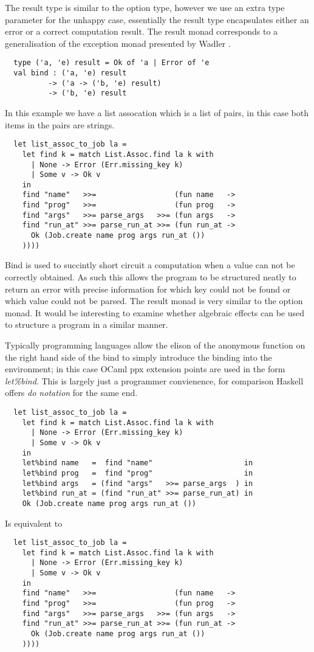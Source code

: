 The result type is similar to the option type, however we use an extra type
parameter for the unhappy case, essentially the result type encapsulates 
either an error or a correct computation result. The result monad
corresponds to a generalisation of the exception monad presented by Wadler \cite{wadler1995monads}.

\begin{verbatim}
  type ('a, 'e) result = Ok of 'a | Error of 'e
  val bind : ('a, 'e) result
          -> ('a -> ('b, 'e) result)
          -> ('b, 'e) result
\end{verbatim}

In this example we have a list assocation which is a list of pairs, in this case both
items in the pairs are strings.

\begin{verbatim}
  let list_assoc_to_job la =
    let find k = match List.Assoc.find la k with
      | None -> Error (Err.missing_key k)
      | Some v -> Ok v
    in
    find "name"   >>=                  (fun name   ->
    find "prog"   >>=                  (fun prog   ->
    find "args"   >>= parse_args   >>= (fun args   ->
    find "run_at" >>= parse_run_at >>= (fun run_at ->
      Ok (Job.create name prog args run_at ())
    ))))
\end{verbatim}

Bind is used to succintly short circuit a computation when a value can not be
correctly obtained. As such this allows the program to be structured neatly to return
an error with precise information for which key could not be found or which value could
not be parsed. The result monad is very similar to the option monad. It would be interesting
to examine whether algebraic effects can be used to structure a program in a similar manner.

Typically programming languages allow the elison of the anonymous function on the right hand side
of the bind to simply introduce the binding into the environment;
in this case OCaml ppx extension points are used in the form \textit{let\%bind}.
This is largely just a programmer convienence,
for comparison Haskell offers \textit{do notation} for the same end.

\begin{verbatim}
  let list_assoc_to_job la =
    let find k = match List.Assoc.find la k with
      | None -> Error (Err.missing_key k)
      | Some v -> Ok v
    in
    let%bind name   =  find "name"                     in
    let%bind prog   =  find "prog"                     in
    let%bind args   = (find "args"   >>= parse_args  ) in
    let%bind run_at = (find "run_at" >>= parse_run_at) in
    Ok (Job.create name prog args run_at ())
\end{verbatim}
Is equivalent to
\begin{verbatim}
  let list_assoc_to_job la =
    let find k = match List.Assoc.find la k with
      | None -> Error (Err.missing_key k)
      | Some v -> Ok v
    in
    find "name"   >>=                  (fun name   ->
    find "prog"   >>=                  (fun prog   ->
    find "args"   >>= parse_args   >>= (fun args   ->
    find "run_at" >>= parse_run_at >>= (fun run_at ->
      Ok (Job.create name prog args run_at ())
    ))))
\end{verbatim}

